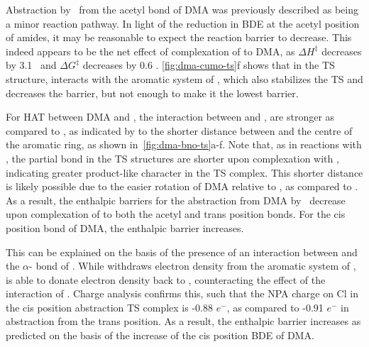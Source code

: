 \begin{doublespace}
Abstraction by \cumo\ from the acetyl  bond of DMA was previously
described as being a minor reaction pathway.\cite{Salamone2013} In light of the
reduction in BDE at the acetyl position of amides, it may be reasonable to
expect the reaction barrier to decrease. This indeed appears to be the net
effect of complexation of  to DMA, as $\Delta H^\ddagger$ decreases by
3.1 \kcalmol\ and $\Delta G^\ddagger$ decreases by 0.6 \kcalmol.
\ref{fig:dma-cumo-ts}f shows that in the TS structure,  interacts with
the aromatic system of \cumo, which also stabilizes the TS and decreases the
barrier, but not enough to make it the lowest barrier.

For HAT between DMA and \bno, the interaction between  and \bno, are
stronger as compared to \cumo, as indicated by to the shorter distance between
 and the centre of the aromatic ring, as shown
in~\ref{fig:dma-bno-ts}a-f. Note that, as in reactions with \cumo, the 
partial bond in the TS structures are shorter upon complexation with ,
indicating greater product-like character in the TS complex. This shorter
distance is likely possible due to the easier rotation of DMA relative to \bno,
as compared to \cumo. As a result, the enthalpic barriers for the abstraction
from DMA by \bno\ decrease upon complexation of  to both the acetyl and
trans position  bonds. For the cis position  bond of DMA, the
enthalpic barrier increases.

This can be explained on the basis of the presence of an interaction between
 and the $\alpha$- bond of \bno. While  withdraws electron
density from the aromatic system of \bno,  is able to donate electron
density back to \bno, counteracting the effect of the interaction of .
Charge analysis confirms this, such that the NPA charge on Cl in the cis
position abstraction TS complex is -0.88 $e^-$, as compared to -0.91 $e^-$ in
abstraction from the trans position. As a result, the enthalpic barrier
increases as predicted on the basis of the increase of the cis position 
BDE of DMA.


\end{doublespace}
